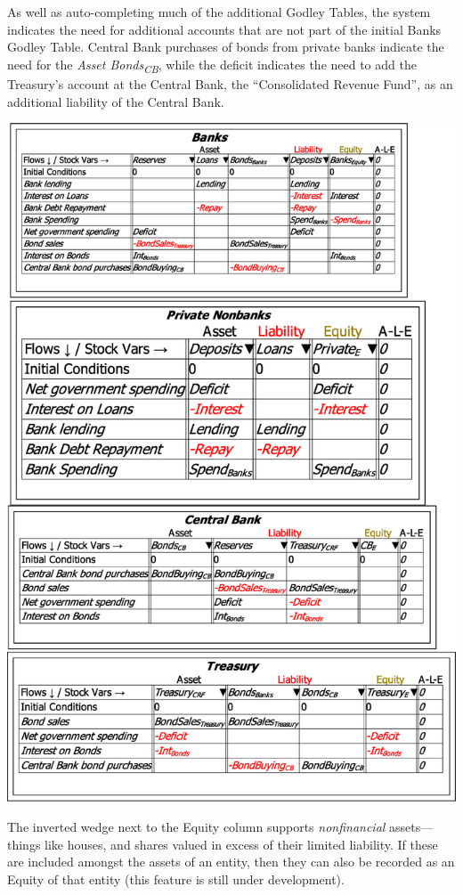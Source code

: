 As well as auto-completing much of the additional Godley Tables, the
system indicates the need for additional accounts that are not part
of the initial Banks Godley Table. Central Bank purchases of bonds
from private banks indicate the need for the \emph{Asset Bonds}\textsubscript{\emph{CB}},
while the deficit indicates the need to add the Treasury's account
at the Central Bank, the ``Consolidated Revenue Fund'', as an additional
liability of the Central Bank.

\noindent\includegraphics[width=\textwidth]{images/GodleyTableImagesMultiTablesFinished}

The inverted wedge next to the Equity column supports \emph{nonfinancial
}assets---things like houses, and shares valued in excess of their
limited liability. If these are included amongst the assets of an
entity, then they can also be recorded as an Equity of that entity
(this feature is still under development).


